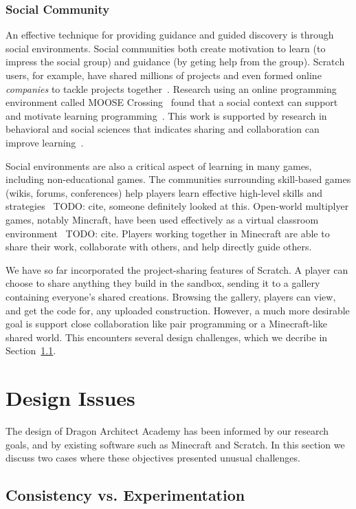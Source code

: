 \documentclass{sig-alternate}
\newcommand{\TODO}[1]{{\color{red} TODO: #1}}
\newcommand{\gametitle}{{\color{RoyalPurple} Dragon Architect Academy}}
\begin{document}
\subsubsection{Social Community}

An effective technique for providing guidance and guided discovery is through social environments.
Social communities both create motivation to learn (to impress the social group) and guidance (by geting help from the group).
Scratch users, for example, have shared millions of projects and even formed online \emph{companies} to tackle projects together~\cite{resnick2009scratch}. 
Research using an online programming environment called MOOSE Crossing~\cite{bruckman1997moose} found that a social context can support and motivate learning programming~\cite{bruckman2000situated}.
This work is supported by research in behavioral and social sciences that indicates sharing and collaboration can improve learning~\cite{bransford2000people}. 

Social environments are also a critical aspect of learning in many games, including non-educational games.
The communities surrounding skill-based games (wikis, forums, conferences) help players learn effective high-level skills and strategies~\TODO{cite, someone definitely looked at this}.
Open-world multiplyer games, notably Mincraft, have been used effectively as a virtual classroom environment~\TODO{cite}.
Players working together in Minecraft are able to share their work, collaborate with others, and help directly guide others.

We have so far incorporated the project-sharing features of Scratch.
A player can choose to share anything they build in the sandbox, sending it to a gallery containing everyone's shared creations.
Browsing the gallery, players can view, and get the code for, any uploaded construction.
However, a much more desirable goal is support close collaboration like pair programming or a Minecraft-like shared world.
This encounters several design challenges, which we decribe in Section~\ref{sec:multiplayer}.

\section{Design Issues}
The design of \gametitle{} has been informed by our research goals, and by existing software such as Minecraft and Scratch. 
In this section we discuss two cases where these objectives presented unusual challenges. 

\subsection{Consistency vs. Experimentation}
\label{sec:multiplayer}
\end{document}
